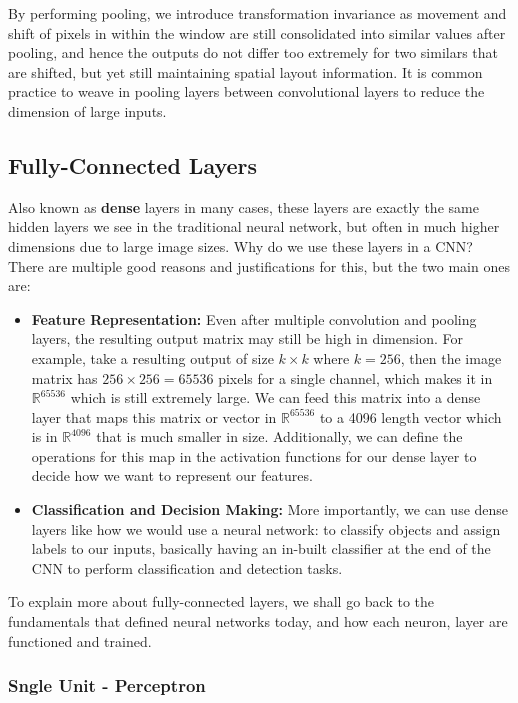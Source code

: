 \documentclass[12pt]{article}
\begin{document}
By performing pooling, we introduce transformation invariance as movement and shift of pixels in within the window are still consolidated into similar values after pooling, and hence the outputs do not differ too extremely for two similars that are shifted, but yet still maintaining spatial layout information. It is common practice to weave in pooling layers between convolutional layers to reduce the dimension of large inputs.

\subsection{Fully-Connected Layers}

Also known as \textbf{dense} layers in many cases, these layers are exactly the same hidden layers we see in the traditional neural network, but often in much higher dimensions due to large image sizes. Why do we use these layers in a CNN? There are multiple good reasons and justifications for this, but the two main ones are:
\begin{itemize}
\item \textbf{Feature Representation:} Even after multiple convolution and pooling layers, the resulting output matrix may still be high in dimension. For example, take a resulting output of size $k \times k$ where $k = 256$, then the image matrix has $256 \times 256 = 65536$ pixels for a single channel, which makes it in $\mathbb{R}^{65536}$ which is still extremely large. We can feed this matrix into a dense layer that maps this matrix or vector in $\mathbb{R}^{65536}$ to a 4096 length vector which is in $\mathbb{R}^{4096}$ that is much smaller in size. Additionally, we can define the operations for this map in the activation functions for our dense layer to decide how we want to represent our features.
\item \textbf{Classification and Decision Making:} More importantly, we can use dense layers like how we would use a neural network: to classify objects and assign labels to our inputs, basically having an in-built classifier at the end of the CNN to perform classification and detection tasks.
\end{itemize}

To explain more about fully-connected layers, we shall go back to the fundamentals that defined neural networks today, and how each neuron, layer are functioned and trained.

\subsubsection{Sngle Unit - Perceptron}
\end{document}
